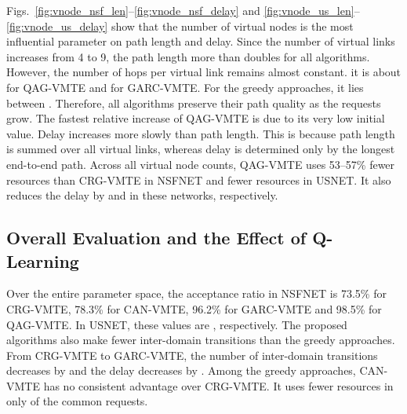 Figs.~\ref{fig:vnode_nsf_len}--\ref{fig:vnode_nsf_delay} and \ref{fig:vnode_us_len}--\ref{fig:vnode_us_delay} show that the number of virtual nodes is the most influential parameter on path length and delay. Since the number of virtual links increases from 4 to 9, the path length more than doubles for all algorithms. However, the number of hops per virtual link remains almost constant.  it is about  for QAG-VMTE and  for GARC-VMTE. For the greedy approaches, it lies between . Therefore, all algorithms preserve their path quality as the requests grow. The fastest relative increase of QAG-VMTE is due to its very low initial value. Delay increases more slowly than path length. This is because path length is summed over all virtual links, whereas delay is determined only by the longest end-to-end path. Across all virtual node counts, QAG-VMTE uses 53--57\% fewer resources than CRG-VMTE in NSFNET and  fewer resources in USNET. It also reduces the delay by  and  in these networks, respectively.

\subsection{Overall Evaluation and the Effect of Q-Learning}
\label{subsec:overall}

Over the entire parameter space, the acceptance ratio in NSFNET is 73.5\% for CRG-VMTE, 78.3\% for CAN-VMTE, 96.2\% for GARC-VMTE and 98.5\% for QAG-VMTE. In USNET, these values are , respectively. The proposed algorithms also make fewer inter-domain transitions than the greedy approaches. From CRG-VMTE to GARC-VMTE, the number of inter-domain transitions decreases by  and the delay decreases by .  Among the greedy approaches, CAN-VMTE has no consistent advantage over CRG-VMTE. It uses fewer resources in only  of the common requests.

